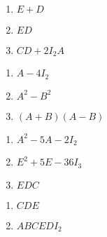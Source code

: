 \begin{multicols}{3} 
\begin{enumerate}
\setcounter{enumi}{\value{HW}}

\item $E + D$
\item $ED$
\item $CD + 2I_{2}A$

\setcounter{HW}{\value{enumi}}
\end{enumerate}
\end{multicols}

\begin{multicols}{3} 
\begin{enumerate}
\setcounter{enumi}{\value{HW}}

\item  $A - 4I_{2}$

\item  $A^2 - B^2$

\item  $(A+B)(A-B)$

\setcounter{HW}{\value{enumi}}
\end{enumerate}
\end{multicols}

\begin{multicols}{3} 
\begin{enumerate}
\setcounter{enumi}{\value{HW}}

\item  $A^2-5A-2I_{2}$

\item  $E^2 + 5E-36I_{3}$

\item $EDC$

\setcounter{HW}{\value{enumi}}
\end{enumerate}
\end{multicols}

\begin{multicols}{3} 
\begin{enumerate}
\setcounter{enumi}{\value{HW}}

\item $CDE$
\item $ABCEDI_{2}$ \label{matarithlast}


\setcounter{HW}{\value{enumi}}
\end{enumerate}
\end{multicols}

